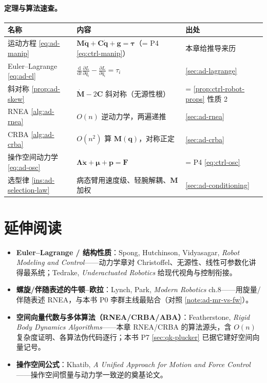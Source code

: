 \paragraph{定理与算法速查。}
\begin{center}
\begin{tabular}{lll}
\toprule
名称 & 内容 & 出处 \\
\midrule
运动方程 \cref{eq:ad-manip} & $\mathbf{M}\ddot{\mathbf{q}}+\mathbf{C}\dot{\mathbf{q}}+\mathbf{g}=\boldsymbol{\tau}$（= P4 \cref{eq:ctrl-manip}）& 本章给推导来历 \\
Euler--Lagrange \cref{eq:ad-el} & $\frac{\mathrm{d}}{\mathrm{d}t}\frac{\partial L}{\partial\dot{q}_i}-\frac{\partial L}{\partial q_i}=\tau_i$ & \cref{sec:ad-lagrange} \\
斜对称 \cref{prop:ad-skew} & $\dot{\mathbf{M}}-2\mathbf{C}$ 斜对称（无源性根）& = \cref{prop:ctrl-robot-props} 性质 2 \\
RNEA \cref{alg:ad-rnea} & $O(n)$ 逆动力学，两遍递推 & \cref{sec:ad-rnea} \\
CRBA \cref{alg:ad-crba} & $O(n^2)$ 算 $\mathbf{M}(\mathbf{q})$，对称正定 & \cref{sec:ad-crba} \\
操作空间动力学 \cref{eq:ad-osc} & $\boldsymbol{\Lambda}\ddot{\mathbf{x}}+\boldsymbol{\mu}+\mathbf{p}=\mathbf{F}$ & = P4 \cref{eq:ctrl-osc} \\
选型律 \cref{ins:ad-selection-law} & 病态臂用速度级、轻腕解耦、$\mathbf{M}$ 加权 & \cref{sec:ad-conditioning} \\
\bottomrule
\end{tabular}
\end{center}

\section{延伸阅读}
\label{sec:ad-further}
\begin{itemize}
  \item \textbf{Euler--Lagrange / 结构性质}：Spong, Hutchinson, Vidyasagar, \emph{Robot Modeling and Control}\cite{spong2006robot}——动力学章对 Christoffel、无源性、线性可参数化讲得最系统；Tedrake, \emph{Underactuated Robotics}\cite{tedrake_underactuated} 给现代视角与控制衔接。
  \item \textbf{螺旋/伴随表述的牛顿--欧拉}：Lynch, Park, \emph{Modern Robotics}\cite{lynch2017modern} ch.8——用旋量/伴随表述 RNEA，与本书 P0 李群主线最贴合（对照 \cref{note:ad-mr-vs-fw}）。
  \item \textbf{空间向量代数与多体算法（RNEA/CRBA/ABA）}：Featherstone, \emph{Rigid Body Dynamics Algorithms}\cite{featherstone2008rbda}——本章 RNEA/CRBA 的算法源头，含 $O(n)$ 复杂度证明、各算法伪代码逐行；本书 P7 \cref{sec:qk-plucker} 已据它建好空间向量记号。
  \item \textbf{操作空间公式}：Khatib, \emph{A Unified Approach for Motion and Force Control}\cite{khatib1987operational}——操作空间惯量与动力学一致逆的奠基论文。
\end{itemize}

